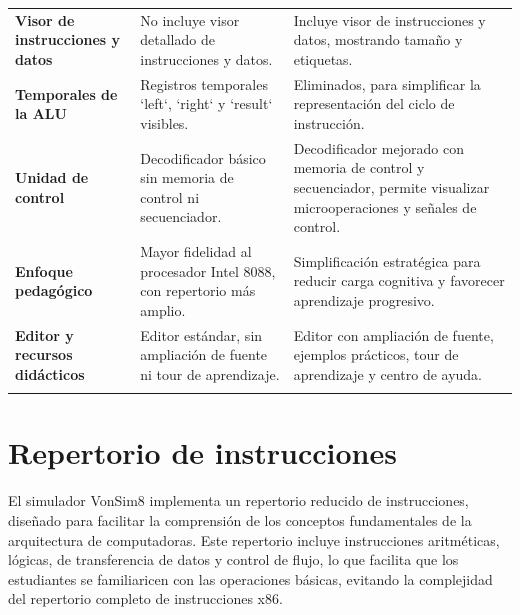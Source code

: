 \documentclass[12pt,oneside]{templates/unerthesis}
\begin{document}
\begin{table}[!h]
{\begin{tabular}[t]{>{\raggedright\arraybackslash}p{4cm}|>{\raggedright\arraybackslash}p{9cm}>{\raggedright\arraybackslash}p{9cm}}
\addlinespace[10pt]
\textbf{Visor de instrucciones y datos} & No incluye visor detallado de instrucciones y datos. & Incluye visor de instrucciones y datos, mostrando tamaño y etiquetas.\\
\addlinespace[10pt]
\textbf{Temporales de la ALU} & Registros temporales `left`, `right` y `result` visibles. & Eliminados, para simplificar la representación del ciclo de instrucción.\\
\addlinespace[10pt]
\addlinespace
\textbf{Unidad de control} & Decodificador básico sin memoria de control ni secuenciador. & Decodificador mejorado con memoria de control y secuenciador, permite visualizar microoperaciones y señales de control.\\
\addlinespace[10pt]
\textbf{Enfoque pedagógico} & Mayor fidelidad al procesador Intel 8088, con repertorio más amplio. & Simplificación estratégica para reducir carga cognitiva y favorecer aprendizaje progresivo.\\
\addlinespace[10pt]
\textbf{Editor y recursos didácticos} & Editor estándar, sin ampliación de fuente ni tour de aprendizaje. & Editor con ampliación de fuente, ejemplos prácticos, tour de aprendizaje y centro de ayuda.\\
\addlinespace[10pt]
\bottomrule
\end{tabular}}
\end{table}

\hypertarget{repertorio-de-instrucciones-1}{%
\section{Repertorio de instrucciones}\label{repertorio-de-instrucciones-1}}

El simulador VonSim8 implementa un repertorio reducido de instrucciones, diseñado para facilitar la comprensión de los conceptos fundamentales de la arquitectura de computadoras. Este repertorio incluye instrucciones aritméticas, lógicas, de transferencia de datos y control de flujo, lo que facilita que los estudiantes se familiaricen con las operaciones básicas, evitando la complejidad del repertorio completo de instrucciones x86.
\end{document}
